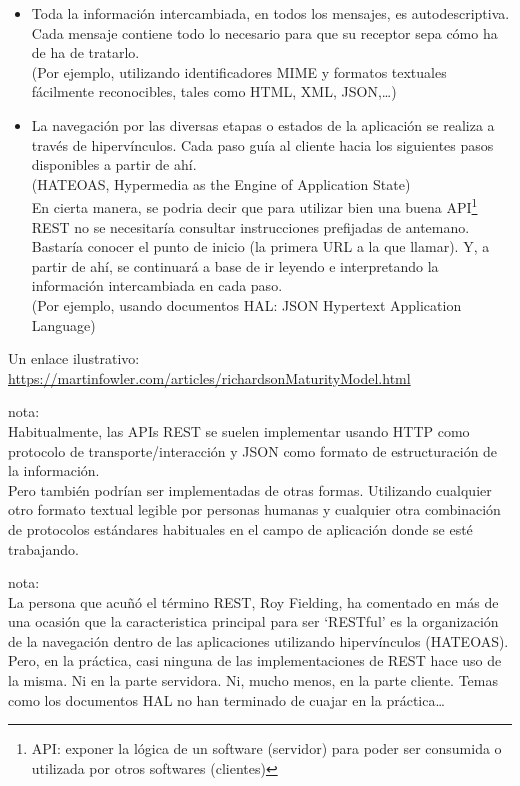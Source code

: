 \documentclass[spanish,12pt,a4paper,final,oneside]{book}
\begin{document}
\begin{itemize}
\begin{itemize}
\item Toda la información intercambiada, en todos los mensajes, es autodescriptiva. Cada mensaje contiene todo lo necesario para que su receptor sepa cómo ha de ha de tratarlo.
\\{\footnotesize (Por ejemplo, utilizando identificadores MIME y formatos textuales fácilmente reconocibles, tales como HTML, XML, JSON,\ldots)}

\item La navegación por las diversas etapas o estados de la aplicación se realiza a través de hipervínculos. Cada paso guía al cliente hacia los siguientes pasos disponibles a partir de ahí.
\\(HATEOAS, Hypermedia as the Engine of Application State)
\\En cierta manera, se podria decir que para utilizar bien una buena API\footnote{API: exponer la lógica de un software (servidor) para poder ser consumida o utilizada por otros softwares (clientes)} REST no se necesitaría consultar instrucciones prefijadas de antemano.
Bastaría conocer el punto de inicio (la primera URL a la que llamar). Y, a partir de ahí, se continuará a base de ir leyendo e interpretando la información intercambiada en cada paso.
\\{\footnotesize (Por ejemplo, usando documentos HAL: JSON Hypertext Application Language)}
\end{itemize}

\end{itemize}

\vspace{0.5cm}
Un enlace ilustrativo:
\\ \url{https://martinfowler.com/articles/richardsonMaturityModel.html}


\vspace{1cm}
nota: 
\\Habitualmente, las APIs REST se suelen implementar usando HTTP como protocolo de transporte/interacción y JSON como formato de estructuración de la información. 
\\Pero también podrían ser implementadas de otras formas. Utilizando cualquier otro formato textual legible por personas humanas y cualquier otra combinación de protocolos estándares habituales en el campo de aplicación donde se esté trabajando.

\vspace{1cm}
nota: 
\\La persona que acuñó el término REST, Roy Fielding, ha comentado en más de una ocasión que la caracteristica principal para ser `RESTful' es la organización de la navegación dentro de las aplicaciones utilizando hipervínculos (HATEOAS). Pero, en la práctica, casi ninguna de las implementaciones de REST hace uso de la misma. Ni en la parte servidora. Ni, mucho menos, en la parte cliente. Temas como los documentos HAL no han terminado de cuajar en la práctica\ldots
\end{document}
